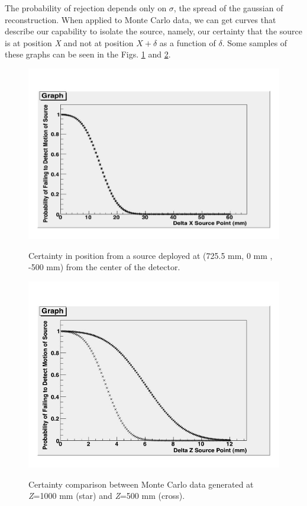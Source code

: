 The probability of rejection depends only on $\sigma$, the spread of the gaussian of reconstruction. When applied to Monte Carlo data, we can get curves that describe our capability to isolate the source, namely, our certainty that the source is at position \emph{X} and not at position $X+\delta$ as a function of $\delta$. Some samples of these graphs can be seen in the Figs. \ref{Conf_725.5} and \ref{Conf 1000}.


\begin{figure}
\caption{Certainty in position from a source deployed at (725.5 mm, 0 mm , -500 mm) from the center of the detector.}
\includegraphics[width=\textwidth]{AA/725_mm_X_-500_mm_Z_DX.jpg}
\label{Conf_725.5}
\end{figure} 

\begin{figure}
\caption{Certainty comparison between Monte Carlo data generated at  \emph{Z}=1000 mm (star) and \emph{Z}=500 mm (cross).}
\includegraphics[width=\textwidth]{AA/1000_Z_500_Z_DX.jpg}
\label{Conf 1000}
\end{figure}


